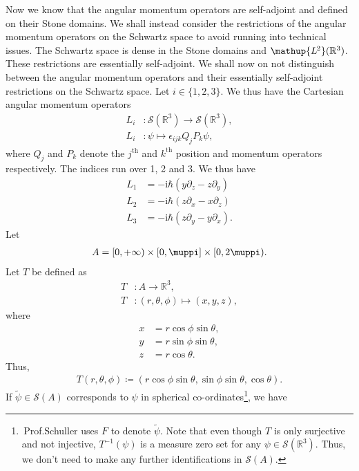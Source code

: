 \documentclass[12pt, a4 paper]{article}
\theoremstyle{definition}
\newcommand{\ltwo}{\mathup{L\kern-0.7pt^2}}
\newcommand{\ltworthree}{\ltwo(\rr^3)}
\newcommand{\position}{Q}
\newcommand{\momentum}{P}
\newcommand{\rthree}{\mathbb{R}^3}
\newcommand{\rr}{\mathbb{R}}
\newcommand{\schwartz}{\mathcal{S}}
\newcommand{\schwartzrthree}{\schwartz(\rr^3)}
\renewcommand{\i}{\mathrm{i}}
\renewcommand{\pi}{\muppi}
\newcommand{\levi}{\epsilon_{ijk}}
\begin{document}
	Now we know that the angular momentum operators are self-adjoint and defined on their Stone domains. We shall instead consider the restrictions of the angular momentum operators on the Schwartz space to avoid running into technical issues. The Schwartz space is dense in the Stone domains and $\ltworthree$. These restrictions are essentially self-adjoint. We shall now on not distinguish between the angular momentum operators and their essentially self-adjoint restrictions on the Schwartz space. Let $i \in \{1,2,3\}$. We thus have the Cartesian angular momentum operators
	\begin{align*}
	    L_i &\colon \schwartzrthree \rightarrow \schwartzrthree,\\
		L_i &\colon \psi \mapsto \levi\position_j\momentum_k\psi,
	\end{align*}
	where $\position_j$ and $\momentum_k$ denote the $j^\text{th}$ and $k^\text{th}$ position and momentum operators respectively. The indices run over 1, 2 and 3.
	We thus have
	\begin{align*}
	    L_1 &= -\i\hbar(y\partial_z - z\partial_y)\\
		L_2 &= -\i\hbar(z\partial_x - x\partial_z)\\
		L_3 &= -\i\hbar(z\partial_y - y\partial_x).
	\end{align*}
	Let
	\begin{align*}
	    A = [0, +\infty) \times [0,\pi] \times [0,2\pi).
	\end{align*}
	Let $T$ be defined as
	\begin{align*}
		T &\colon A \rightarrow \rthree,\\
		T &\colon (r, \theta, \phi) \mapsto (x, y, z),
	\end{align*}
	where
	\begin{align*}
		x &= r \cos{\phi} \sin{\theta},\\
		y &= r \sin{\phi} \sin{\theta},\\
		z &= r \cos{\theta}.
	\end{align*}
	Thus,
	\begin{align*}
	    T(r, \theta, \phi) \coloneq (r \cos{\phi} \sin{\theta}, \sin{\phi} \sin{\theta}, \cos{\theta}).
	\end{align*}
	If $\tilde{\psi} \in \schwartz(A)$ corresponds to $\psi$ in spherical co-ordinates\footnote{\,Prof.\@ Schuller uses $F$ to denote $\tilde{\psi}$. Note that even though $T$ is only surjective and not injective, $T^{-1}(\psi)$ is a measure zero set for any $\psi \in \schwartzrthree$. Thus, we don't need to make any further identifications in $\schwartz(A)$.}, we have
\end{document}
